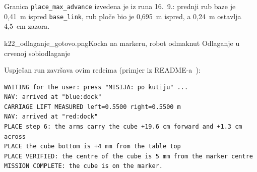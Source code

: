 Granica \texttt{place\_max\_advance} izvedena je iz runa 16.~9.: prednji rub baze je 0{,}41~m ispred
\texttt{base\_link}, rub ploče bio je 0{,}695~m ispred, a 0{,}24~m ostavlja 4{,}5~cm zazora.

%
  {k22_odlaganje_gotovo.png}{Kocka na markeru, robot odmaknut}%
  {Odlaganje u crvenoj sobi}{odlaganje}

Uspješan run završava ovim redcima (primjer iz README-a~\cite{pasdualarm}):
\begin{lstlisting}[style=code-bash, numbers=none]
WAITING for the user: press "MISIJA: po kutiju" ...
NAV: arrived at "blue:dock"
CARRIAGE LIFT MEASURED left=0.5500 right=0.5500 m
NAV: arrived at "red:dock"
PLACE step 6: the arms carry the cube +19.6 cm forward and +1.3 cm across
PLACE the cube bottom is +4 mm from the table top
PLACE VERIFIED: the centre of the cube is 5 mm from the marker centre
MISSION COMPLETE: the cube is on the marker.
\end{lstlisting}
